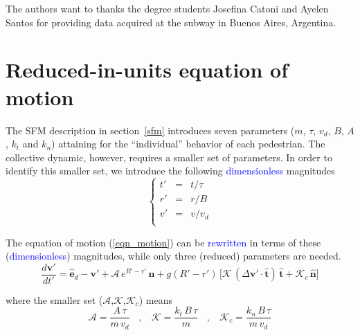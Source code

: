 \documentclass[preprint,12pt]{elsarticle}
\begin{document}
The authors want to thanks the degree students Josefina Catoni and Ayelen Santos for providing data acquired at 
the subway in Buenos Aires, Argentina. 

\appendix

\section{\label{appendix1}Reduced-in-units equation of motion}

The SFM description in section~\ref{sfm} introduces seven parameters ($m$, 
$\tau$, $v_d$, $B$, $A$, $k_t$ and $k_n$) attaining for the ``individual'' 
behavior of each pedestrian. The collective dynamic, however, requires a 
smaller set of parameters. In order to identify this smaller set, we introduce 
the following \textcolor{blue}{dimensionless} magnitudes\\

\begin{equation}
 \left\{\begin{array}{lcl}
         t' & = & t/\tau \\
         r' & = & r/B \\
         v' & = & v/v_d \\
        \end{array}\right.
\end{equation}

The equation of motion (\ref{eqn_motion}) can be \textcolor{blue}{rewritten} in terms of these 
(\textcolor{blue}{dimensionless}) magnitudes, while only three (reduced) parameters are needed.\\


\begin{equation}
 \displaystyle\frac{d\mathbf{v}'}{dt'}=
 \hat{\mathbf{e}}_d-\mathbf{v}'+\mathcal{A}\,e^{R'-r'}\,
 \hat{\mathbf{n}}+g(R'-r')\,\bigg[\mathcal{K}\,(\Delta\mathbf{v}'\cdot
 \hat{\mathbf{t}})\,\hat{\mathbf{t}}+\mathcal{K}_c\,\hat{\mathbf{n}}\bigg]
\end{equation}



\noindent where the smaller set ($\mathcal{A}$,$\mathcal{K}$,$\mathcal{K}_c$) 
means\\

\begin{equation}
 \mathcal{A}=\displaystyle\frac{A\,\tau}{m\,v_d}\ \ \ \ , \ \ \ \ 
 \mathcal{K}=\displaystyle\frac{k_t\,B\,\tau}{m}\ \ \ \ , \ \ \ \
 \mathcal{K}_c=\displaystyle\frac{k_n\,B\,\tau}{m\,v_d}
\end{equation}
\end{document}

